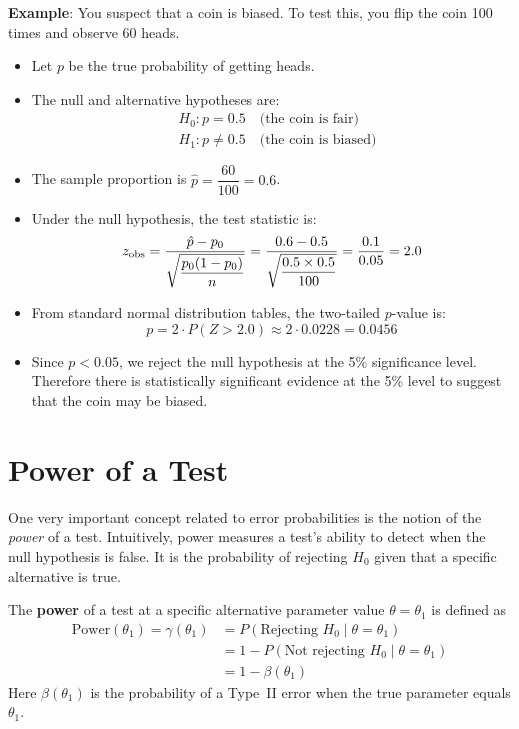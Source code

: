 \documentclass[twoside]{book}
\begin{document}
\textbf{Example}: You suspect that a coin is biased. To test this, you flip the coin 100 times and observe 60 heads.

\begin{itemize}
	\item Let \(p\) be the true probability of getting heads.
	\item The null and alternative hypotheses are:
	\begin{align*}
	&H_0: p = 0.5 \quad \text{(the coin is fair)} \\
	&H_1: p \neq 0.5 \quad \text{(the coin is biased)}
	\end{align*}
	\item The sample proportion is \(\hat{p} = \dfrac{60}{100} = 0.6\).

	\item Under the null hypothesis, the test statistic is:
	\[
	z_{\rm obs} = \frac{\hat{p} - p_0}{\sqrt{\dfrac{p_0(1 - p_0)}{n}}}
	= \frac{0.6 - 0.5}{\sqrt{\dfrac{0.5 \times 0.5}{100}}}
	= \frac{0.1}{0.05} = 2.0
	\]

	\item From standard normal distribution tables, the two-tailed \(p\)-value is:
	\[
	p = 2 \cdot P(Z > 2.0) \approx 2 \cdot 0.0228 = 0.0456
	\]

	\item Since \(p < 0.05\), we reject the null hypothesis at the 5\% significance level. Therefore there is statistically significant evidence at the 5\% level to suggest that the coin may be biased.
\end{itemize}


\section{Power of a Test}

One very important concept related to error probabilities is the notion of the \emph{power} of a test. Intuitively, power measures a test's ability to detect when the null hypothesis is false. It is the probability of rejecting $ H_0 $ given that a speciﬁc alternative is true.

\begin{textbox}
	The \textbf{power} of a test at a specific alternative parameter value $\theta=\theta_1$ is defined as
	\begin{align*}
	\mathrm{Power}(\theta_1)=\gamma(\theta_1) &= P(\text{Rejecting }H_0\mid \theta = \theta_1)\\
	&=1-P(\text{Not rejecting }H_0\mid \theta = \theta_1)\\
	& = 1 - \beta(\theta_1)
	\end{align*}
Here $\beta(\theta_1)$ is the probability of a Type~II error when the true parameter equals $\theta_1$.
\end{textbox}
\bigskip
\end{document}
